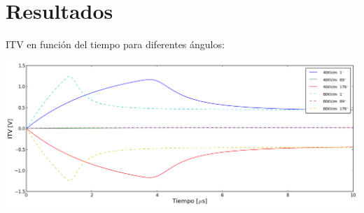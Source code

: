 \documentclass[a0,portrait]{a0poster}
\begin{document}
\begin{multicols}{2}
\begin{multicols}{2}
\end{multicols}

\section*{Resultados}

ITV en función del tiempo para diferentes ángulos:


		\begin{center}\vspace{1cm}
			\includegraphics[width=1\linewidth]{itv-long}
		\end{center}\vspace{1cm}


\end{multicols}
\end{document}
